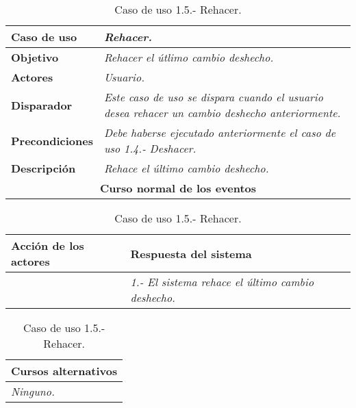\documentclass[twoside,a4paper,11pt]{book}
\begin{document}
\begin{table}[!ht]
    \centering
    \begin{tabular}{|p{4cm}|p{11.5cm}|}
    \hline

    \textbf{Caso de uso} & \textit{Rehacer.}\\
    \hline

    \textbf{Objetivo} & \textit{Rehacer el útlimo cambio deshecho.}\\
    \hline

    \textbf{Actores} & \textit{Usuario.}\\
    \hline

    \textbf{Disparador} & \textit{Este caso de uso se dispara cuando el usuario desea rehacer un cambio deshecho anteriormente.}\\
    \hline

    \textbf{Precondiciones} & \textit{Debe haberse ejecutado anteriormente el caso de uso 1.4.- Deshacer.}\\
    \hline

    \textbf{Descripción} & \textit{Rehace el último cambio deshecho.}\\
    \hline

    \multicolumn{2}{|c|}{\textbf{Curso normal de los eventos}}\\
    \hline

    \end{tabular}
    \begin{tabular}{|p{7.75cm}|p{7.75cm}|}
    \hspace{2cm}\textbf{Acción de los actores} & \hspace{1.75cm}\textbf{Respuesta del sistema}\\
    \hline

    &
    \textit{1.- El sistema rehace el último cambio deshecho.}
    \\
    \hline
    \end{tabular}

    \begin{tabular}{|p{15.9cm}|}
      \hspace{6cm}\textbf{Cursos alternativos}\\
      \hline     
	\textit{Ninguno.}
      \\
      \hline
    \end{tabular}
    \caption{Caso de uso 1.5.- Rehacer.}
\end{table}
\end{document}

